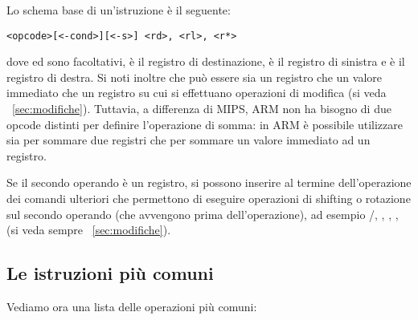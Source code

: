 \documentclass[class=book, crop=false, oneside]{standalone}
\begin{document}
Lo schema base di un'istruzione è il seguente:
\begin{center}
	\texttt{<opcode>[<-cond>][<-s>] <rd>, <rl>, <r*>}
\end{center}
dove  ed  sono facoltativi,  è il registro di destinazione,  è il registro di sinistra e  è il registro di destra. Si noti inoltre che  può essere sia un registro che un valore immediato che un registro su cui si effettuano operazioni di modifica (si veda ~\ref{sec:modifiche}). Tuttavia, a differenza di MIPS, ARM non ha bisogno di due opcode distinti per definire l'operazione di somma: in ARM è possibile utilizzare  sia per sommare due registri che per sommare un valore immediato ad un registro.

Se il secondo operando è un registro, si possono inserire al termine dell'operazione dei comandi ulteriori che permettono di eseguire operazioni di shifting o rotazione sul secondo operando (che avvengono prima dell'operazione), ad esempio /, , , ,  (si veda sempre ~\ref{sec:modifiche}).

\subsection*{Le istruzioni più comuni}
Vediamo ora una lista delle operazioni più comuni:
\end{document}
